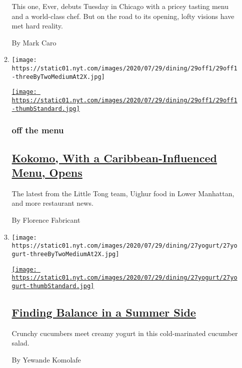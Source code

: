 \begin{enumerate}
\begin{enumerate}
    This one, Ever, debuts Tuesday in Chicago with a pricey tasting menu
    and a world-class chef. But on the road to its opening, lofty
    visions have met hard reality.

    By Mark Caro
  \item
    \texttt{[image: https://static01.nyt.com/images/2020/07/29/dining/29off1/29off1-threeByTwoMediumAt2X.jpg]}

    \href{/2020/07/28/dining/nyc-restaurant-news.html}{\texttt{[image: https://static01.nyt.com/images/2020/07/29/dining/29off1/29off1-thumbStandard.jpg]}}

    \hypertarget{off-the-menu}{%
    \subsubsection{off the menu}\label{off-the-menu}}

    \hypertarget{kokomo-with-a-caribbean-influenced-menu-opens}{%
    \subsection{\texorpdfstring{\href{/2020/07/28/dining/nyc-restaurant-news.html}{Kokomo,
    With a Caribbean-Influenced Menu,
    Opens}}{Kokomo, With a Caribbean-Influenced Menu, Opens}}\label{kokomo-with-a-caribbean-influenced-menu-opens}}

    The latest from the Little Tong team, Uighur food in Lower
    Manhattan, and more restaurant news.

    By Florence Fabricant
  \item
    \texttt{[image: https://static01.nyt.com/images/2020/07/29/dining/27yogurt/27yogurt-threeByTwoMediumAt2X.jpg]}

    \href{/2020/07/27/dining/cucumbers-yogurt-recipe.html}{\texttt{[image: https://static01.nyt.com/images/2020/07/29/dining/27yogurt/27yogurt-thumbStandard.jpg]}}

    \hypertarget{finding-balance-in-a-summer-side}{%
    \subsection{\texorpdfstring{\href{/2020/07/27/dining/cucumbers-yogurt-recipe.html}{Finding
    Balance in a Summer
    Side}}{Finding Balance in a Summer Side}}\label{finding-balance-in-a-summer-side}}

    Crunchy cucumbers meet creamy yogurt in this cold-marinated cucumber
    salad.

    By Yewande Komolafe
  \end{enumerate}
\end{enumerate}

